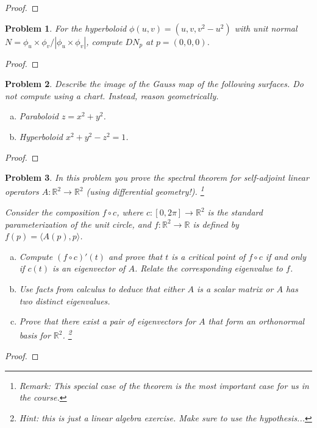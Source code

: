 \documentclass[11pt]{article}
\newtheorem{problem}{Problem}
\begin{document}
\begin{proof}

\end{proof}

\pagebreak

\begin{problem}
For the hyperboloid $\phi(u,v)=(u,v,v^2-u^2)$ with unit normal $N=\phi_u\times\phi_v/|\phi_u\times \phi_v|$, compute $DN_p$ at $p=(0,0,0)$. 
\end{problem}

\begin{proof}

\end{proof}

\pagebreak

\begin{problem}
Describe the image of the Gauss map of the following surfaces. Do \emph{not} compute using a chart. Instead, reason geometrically.
\begin{enumerate}[(a)]
\item Paraboloid $z=x^2+y^2$. 
\item Hyperboloid $x^2+y^2-z^2=1$. 
\end{enumerate} 
\end{problem}

\begin{proof}

\end{proof}

\pagebreak


\begin{problem}
In this problem you prove the spectral theorem for self-adjoint linear operators $A:\mathbb R^2\to\mathbb R^2$ (using differential geometry!). \footnote{Remark: This special case of the theorem is the most important case for us in the course.}

Consider the composition $f\circ c$, where $c:[0,2\pi]\to\mathbb R^2$ is the standard parameterization of the unit circle, and $f:\mathbb R^2\to\mathbb R$ is defined by $f(p)=\langle A(p), p\rangle$. 
\begin{enumerate}[(a)]
\item Compute $(f\circ c)'(t)$ and prove that $t$ is a critical point of $f\circ c$ if and only if $c(t)$ is an eigenvector of $A$. Relate the corresponding eigenvalue to $f$. 
\item Use facts from calculus to deduce that either $A$ is a scalar matrix or $A$ has two distinct eigenvalues. 
\item Prove that there exist a pair of eigenvectors for $A$ that form an orthonormal basis for $\mathbb R^2$. \footnote{Hint: this is just a linear algebra exercise. Make sure to use the hypothesis...}
\end{enumerate} 
\end{problem}

\begin{proof}

\end{proof}
\end{document}
